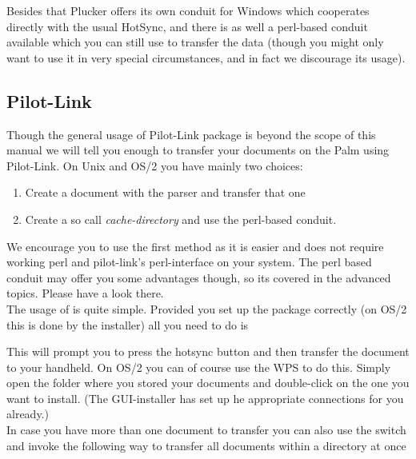 Besides that Plucker offers its own conduit for Windows which
cooperates directly with the usual HotSync, and there is as well a
perl-based conduit available which you can still use to transfer the
data (though you might only want to use it in very special
circumstances, and in fact we discourage its usage).

\subsection{Pilot-Link}

Though the general usage of Pilot-Link package is beyond the scope of
this manual we will tell you enough to transfer your documents on the
Palm using Pilot-Link. On Unix and OS/2 you have mainly two choices:

\begin{enumerate}
  \item Create a document with the parser and transfer that one
  \item Create a so call \textit{cache-directory} and use the
        perl-based conduit.
\end{enumerate}

We encourage you to use the first method as it is easier and does not
require working perl and pilot-link's perl-interface on your system.
The perl based conduit may offer you some advantages though, so its
covered in the advanced topics. Please have a look there.\\

The usage of  is quite simple. Provided you set up
the package correctly (on OS/2 this is done by the installer) all
you need to do is


This will prompt you to press the hotsync button and then transfer the
document to your handheld. On OS/2 you can of course use the WPS to do
this. Simply open the folder where you stored your documents and
double-click on the one you want to install. (The GUI-installer has
set up he appropriate connections for you already.)\\

\hint{} In case you have more than one document to transfer you can
also use the  switch and invoke  the
following way to transfer all documents within a directory at once

\\


